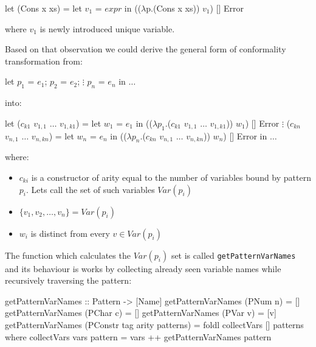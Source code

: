 \documentclass[12pt,a4paper]{report}
\begin{document}
\vspace*{0.2in}
\begin{code}[style=haskell,mathescape=true]
let (Cons x xs) = let $v_{1}$ = $expr$
                  in (($\lambda$p.(Cons x xs)) $v_{1}$) [] Error
\end{code}

where $v_{1}$ is newly introduced unique variable.

Based on that observation we could derive the general form of conformality
transformation from:

\vspace*{0.2in}
\begin{code}[style=haskell,mathescape=true]
let $p_{1}$ = $e_{1}$;
    $p_{2}$ = $e_{2}$;
       $\vdots$
    $p_{n}$ = $e_{n}$
in $\ldots$
\end{code}

into:

\vspace*{0.2in}
\begin{code}[style=haskell,mathescape=true]
let
    ($c_{k1}$ $v_{1,1}$ $\ldots$ $v_{1,k1}$) = let $w_{1}$ = $e_{1}$
                      in (($\lambda p_{1}$.($c_{k1}$ $v_{1,1}$ $\ldots$ $v_{1,k1}$)) $w_{1}$) [] Error
                               $\vdots$
    ($c_{kn}$ $v_{n,1}$ $\ldots$ $v_{n,kn}$) = let $w_{n}$ = $e_{n}$
                      in (($\lambda p_{n}$.($c_{kn}$ $v_{n,1}$ $\ldots$ $v_{n,kn}$)) $w_{n}$) [] Error
in $\ldots$
\end{code}

where:
\begin{itemize}
  \item $c_{ki}$ is a constructor of arity equal to the number of variables
    bound by pattern $p_{i}$. Lets call the set of such variables $Var(p_{i})$
  \item $\{v_1, v_2, \ldots, v_n\} = Var(p_i)$
  \item $w_{i}$ is distinct from every $v \in Var(p_i)$
\end{itemize}
The function which calculates the $Var(p_i)$ set is called
\texttt{getPatternVarNames} and its behaviour is works by collecting already
seen variable names while recursively traversing the pattern:

\vspace*{0.2in}
\begin{code}[style=haskell]
getPatternVarNames :: Pattern -> [Name]
getPatternVarNames (PNum n) = []
getPatternVarNames (PChar c) = []
getPatternVarNames (PVar v) = [v]
getPatternVarNames (PConstr tag arity patterns) = foldl collectVars [] patterns
    where
        collectVars vars pattern = vars ++ getPatternVarNames pattern
\end{code}
\end{document}
